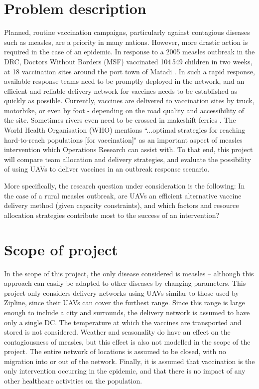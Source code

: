 \section{Problem description}
Planned, routine vaccination campaigns, particularly against contagious diseases such as measles, are a priority in many nations. However, more drastic action is required in the case of an epidemic. In response to a 2005 measles outbreak in the DRC, Doctors Without Borders (MSF) vaccinated 104\,549 children in two weeks, at 18 vaccination sites around the port town of Matadi \cite{msf_2006}. In such a rapid response, available response teams need to be promptly deployed in the network, and an efficient and reliable delivery network for vaccines needs to be established as quickly as possible. Currently, vaccines are delivered to vaccination sites by truck, motorbike, or even by foot - depending on the road quality and accessibility of the site. Sometimes rivers even need to be crossed in makeshift ferries \cite{msf_2017}. The World Health Organisation (WHO) mentions ``...optimal strategies for reaching hard-to-reach populations [for vaccination]" \cite{world2017measles} as an important aspect of measles intervention which Operations Research can assist with. To that end, this project will compare team allocation and delivery strategies, and evaluate the possibility of using UAVs to deliver vaccines in an outbreak response scenario.

More specifically, the research question under consideration is the following: In the case of a rural measles outbreak, are UAVs an efficient alternative vaccine delivery method (given capacity constraints), and which factors and resource allocation strategies contribute most to the success of an intervention?

\section{Scope of project}
In the scope of this project, the only disease considered is measles -- although this approach can easily be adapted to other diseases by changing parameters. This project only considers delivery networks using UAVs similar to those used by Zipline, since their UAVs can cover the furthest range. Since this range is large enough to include a city and surrounds, the delivery network is assumed to have only a single DC. The temperature at which the vaccines are transported and stored is not considered. Weather and seasonality do have an effect on the contagiousness of measles, but this effect is also not modelled in the scope of the project. The entire network of locations is assumed to be closed, with no migration into or out of the network. Finally, it is assumed that vaccination is the only intervention occurring in the epidemic, and that there is no impact of any other healthcare activities on the population.


